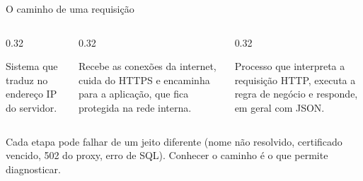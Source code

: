 \documentclass[aspectratio=169,10pt]{beamer}
\begin{document}
\begin{frame}{O caminho de uma requisição}
  \centering
  \vspace{6pt}
  \begin{columns}[T]
    \begin{column}{0.32\textwidth}
      \begin{definicao}[DNS]
        Sistema que traduz  no endereço IP do servidor.
      \end{definicao}
    \end{column}
    \begin{column}{0.32\textwidth}
      \begin{definicao}
        Recebe as conexões da internet, cuida do HTTPS e encaminha para a aplicação, que fica protegida na rede interna.
      \end{definicao}
    \end{column}
    \begin{column}{0.32\textwidth}
      \begin{definicao}
        Processo que interpreta a requisição HTTP, executa a regra de negócio e responde, em geral com JSON.
      \end{definicao}
    \end{column}
  \end{columns}
  \begin{dica}
    Cada etapa pode falhar de um jeito diferente (nome não resolvido, certificado vencido, 502 do proxy, erro de SQL). Conhecer o caminho é o que permite diagnosticar.
  \end{dica}
\end{frame}
\end{document}
